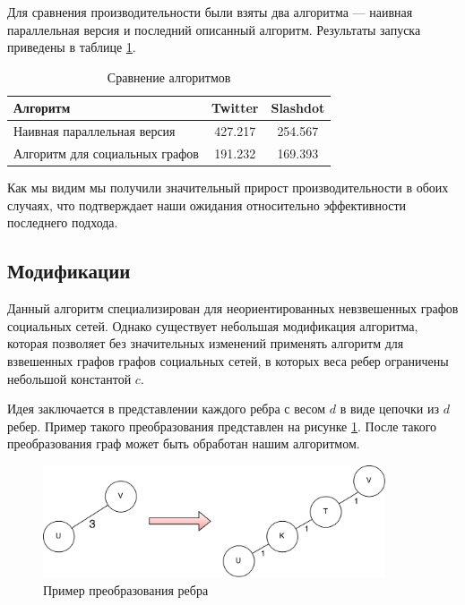 \FloatBarrier

Для сравнения производительности были взяты два алгоритма --- наивная параллельная версия и последний описанный алгоритм. Результаты запуска приведены в таблице \ref{table:algo_floyd_comparison}.   


\FloatBarrier
\begin{table}[H]
\centering

\begin{tabular}{l|c|c}  
Алгоритм & Twitter & Slashdot\\
\hline\hline
Наивная параллельная версия & 427.217 & 254.567 \\  
Алгоритм для социальных графов & 191.232 & 169.393  \\
\hline
\end{tabular}

\caption{Сравнение алгоритмов}
\label {table:algo_floyd_comparison}
\end{table}
\FloatBarrier

Как мы видим мы получили значительный прирост производительности в обоих случаях, что подтверждает наши ожидания относительно эффективности последнего подхода.

\FloatBarrier
\subsection{Модификации}

Данный алгоритм специализирован для неориентированных невзвешенных графов социальных сетей. Однако существует небольшая модификация алгоритма, которая позволяет без значительных изменений применять алгоритм для взвешенных графов графов социальных сетей, в которых веса ребер ограничены небольшой константой $c$. 

Идея заключается в представлении каждого ребра с весом $d$ в виде цепочки из $d$ ребер. Пример такого преобразования представлен на рисунке \ref{edge_modification}. После такого преобразования граф может быть обработан нашим алгоритмом.

\FloatBarrier

\begin{figure}[h]
\caption{Пример преобразования ребра}
\label{edge_modification}
\centering
\includegraphics[width=0.9\textwidth]{img/floyd_social_modification.png}
\end{figure}
\FloatBarrier

